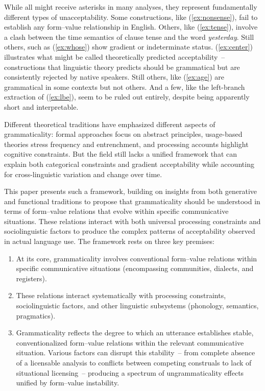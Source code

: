 \documentclass[12pt,letterpaper]{article}
\begin{document}
While all might receive asterisks in many analyses, they represent fundamentally different types of unacceptability. Some constructions, like (\ref{ex:nonsense}), fail to establish any form--value relationship in English. Others, like (\ref{ex:tense}), involve a clash between the time semantics of clause tense and the word \textit{yesterday}. Still others, such as (\ref{ex:whose}) show gradient or indeterminate status. (\ref{ex:center}) illustrates what might be called theoretically predicted acceptability~-- constructions that linguistic theory predicts should be grammatical but are consistently rejected by native speakers. Still others, like (\ref{ex:age}) are grammatical in some contexts but not others. And a few, like the left-branch extraction of (\ref{ex:lbe}), seem to be ruled out entirely, despite being apparently short and interpretable.

Different theoretical traditions have emphasized different aspects of grammaticality: formal approaches focus on abstract principles, usage-based theories stress frequency and entrenchment, and processing accounts highlight cognitive constraints. But the field still lacks a unified framework that can explain both categorical constraints and gradient acceptability while accounting for cross-linguistic variation and change over time.

This paper presents such a framework, building on insights from both generative and functional traditions to propose that grammaticality should be understood in terms of form--value relations that evolve within specific communicative situations. These relations interact with both universal processing constraints and sociolinguistic factors to produce the complex patterns of acceptability observed in actual language use. The framework rests on three key premises:

\begin{enumerate}
\item At its core, grammaticality involves conventional form--value relations within specific communicative situations (encompassing communities, dialects, and registers).
\item These relations interact systematically with processing constraints, sociolinguistic factors, and other linguistic subsystems (phonology, semantics, pragmatics).
\item Grammaticality reflects the degree to which an utterance establishes stable, conventionalized form--value relations within the relevant communicative situation. Various factors can disrupt this stability~-- from complete absence of a licensable analysis to conflicts between competing construals to lack of situational licensing~-- producing a spectrum of ungrammaticality effects unified by form--value instability.
\end{enumerate}
\end{document}
